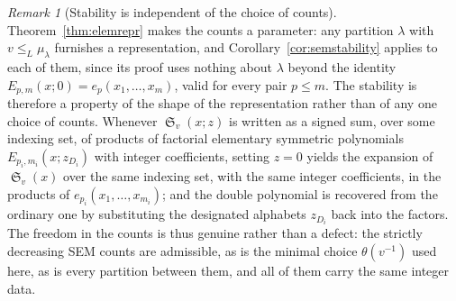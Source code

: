 \documentclass{amsart}
\theoremstyle{definition}
\theoremstyle{remark}
\newtheorem{remark}[lemma]{Remark}
\numberwithin{equation}{section}
\DeclareMathOperator{\sch}{\mathfrak{S}}
\begin{document}
\begin{remark}[Stability is independent of the choice of counts] \label{remark:semstability}
Theorem~\ref{thm:elemrepr} makes the counts a parameter: any partition $\lambda$ with $v\leq_L\mu_\lambda$ furnishes a representation, and Corollary~\ref{cor:semstability} applies to each of them, since its proof uses nothing about $\lambda$ beyond the identity $E_{p,m}(x;0)=e_p(x_1,\ldots,x_m)$, valid for every pair $p\leq m$. The stability is therefore a property of the shape of the representation rather than of any one choice of counts. Whenever $\sch_v(x;z)$ is written as a signed sum, over some indexing set, of products of factorial elementary symmetric polynomials $E_{p_i,m_i}(x;z_{D_i})$ with integer coefficients, setting $z=0$ yields the expansion of $\sch_v(x)$ over the same indexing set, with the same integer coefficients, in the products of $e_{p_i}(x_1,\ldots,x_{m_i})$; and the double polynomial is recovered from the ordinary one by substituting the designated alphabets $z_{D_i}$ back into the factors. The freedom in the counts is thus genuine rather than a defect: the strictly decreasing SEM counts are admissible, as is the minimal choice $\theta(v^{-1})$ used here, as is every partition between them, and all of them carry the same integer data.
\end{remark}
\end{document}
